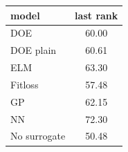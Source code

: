 \begin{tabular}{|lc|}
\hline
model & last rank\\
\hline
DOE & 60.00 \\
DOE plain & 60.61 \\
ELM & 63.30 \\
Fitloss & 57.48 \\
GP & 62.15 \\
NN & 72.30 \\
No surrogate & 50.48 \\
\hline
\end{tabular}
